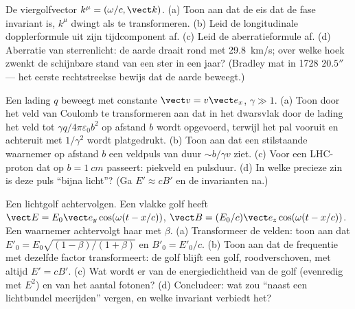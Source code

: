\begin{exercise}[$\star\star$]\label{exo:b3:covariant-electromagnetism:8}
De viergolfvector $k^\mu = (\omega/c, \vect k)$. (a) Toon aan dat de eis
dat de fase invariant is, $k^\mu$ dwingt als  te transformeren.
(b) Leid de longitudinale dopplerformule uit zijn tijdcomponent af. (c)
Leid de aberratieformule af. (d) Aberratie van sterrenlicht: de aarde
draait rond met \qty{29.8}{km/s}; over welke hoek zwenkt de schijnbare
stand van een ster in een jaar? (Bradley mat in 1728 $20.5''$ --- het
eerste rechtstreekse bewijs dat de aarde beweegt.)
\end{exercise}

\begin{exercise}[$\star\star$]\label{exo:b3:covariant-electromagnetism:9}
Een lading $q$ beweegt met constante $\vect v = v\vect e_x$, $\gamma \gg
1$. (a) Toon door het veld van Coulomb te transformeren aan dat in het
dwarsvlak door de lading het veld tot $\gamma
q/4\pi\varepsilon_0b^2$ op
afstand $b$ wordt opgevoerd, terwijl het pal vooruit en achteruit met
$1/\gamma^2$ wordt platgedrukt. (b) Toon aan dat een stilstaande
waarnemer op afstand $b$ een veldpuls van duur $\sim b/\gamma v$ ziet. (c)
Voor een LHC-proton dat op $b = \qty{1}{cm}$ passeert: piekveld en
pulsduur. (d) In welke precieze zin is deze puls ``bijna licht''? (Ga $E' \approx cB'$ en de invarianten na.)
\end{exercise}

\begin{exercise}[$\star\star\star$]\label{exo:b3:covariant-electromagnetism:10}
Een lichtgolf achtervolgen. Een vlakke golf heeft $\vect E = E_0\vect e_y
\cos(\omega(t - x/c))$, $\vect B = (E_0/c)\vect e_z\cos(\omega(t -
x/c))$. Een waarnemer achtervolgt haar met $\beta$. (a) Transformeer de
velden: toon aan dat $E'_0 = E_0\sqrt{(1-\beta)/(1+\beta)}$ en $B'_0 = E'_0/c$. (b) Toon aan dat de frequentie met dezelfde factor transformeert:
de golf blijft een golf, roodverschoven, met altijd $E' = cB'$. (c) Wat
wordt er van de energiedichtheid van de golf (evenredig met $E^2$) en van
het aantal fotonen? (d) Concludeer: wat zou ``naast een lichtbundel
meerijden'' vergen, en welke invariant verbiedt het?
\end{exercise}

